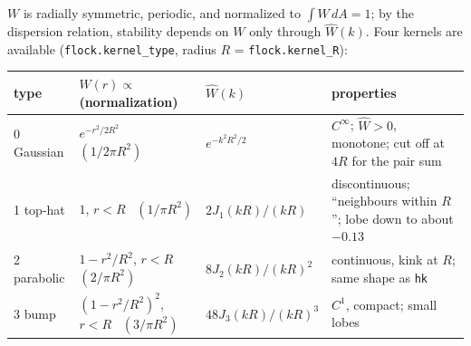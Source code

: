 \documentclass[11pt]{article}
\newcommand{\code}[1]{\texttt{#1}}
\newcommand{\Wh}{\hat W}
\begin{document}
$W$ is radially symmetric, periodic, and normalized to $\int W\,dA=1$; by the
dispersion relation, stability depends on $W$ only through $\Wh(k)$. Four
kernels are available (\code{flock.kernel\_type}, radius
$R$ = \code{flock.kernel\_R}):
\begin{center}
\begin{tabularx}{\textwidth}{@{}lllL@{}}
\toprule
type & $W(r)\propto$ (normalization) & $\Wh(k)$ & properties \\
 Gaussian & $e^{-r^2/2R^2}$ \ $(1/2\pi R^2)$ & $e^{-k^2R^2/2}$ & $C^\infty$; $\Wh>0$, monotone; cut off at $4R$ for the pair sum \\
1 top-hat & $1$, $r<R$ \ $(1/\pi R^2)$ & $2J_1(kR)/(kR)$ & discontinuous; ``neighbours within $R$''; lobe down to about $-0.13$ \\
2 parabolic & $1-r^2/R^2$, $r<R$ \ $(2/\pi R^2)$ & $8J_2(kR)/(kR)^2$ & continuous, kink at $R$; same shape as \code{hk} \\
3 bump & $(1-r^2/R^2)^2$, $r<R$ \ $(3/\pi R^2)$ & $48J_3(kR)/(kR)^3$ & $C^1$, compact; small lobes \\
\bottomrule
\end{tabularx}
\end{center}
\end{document}
